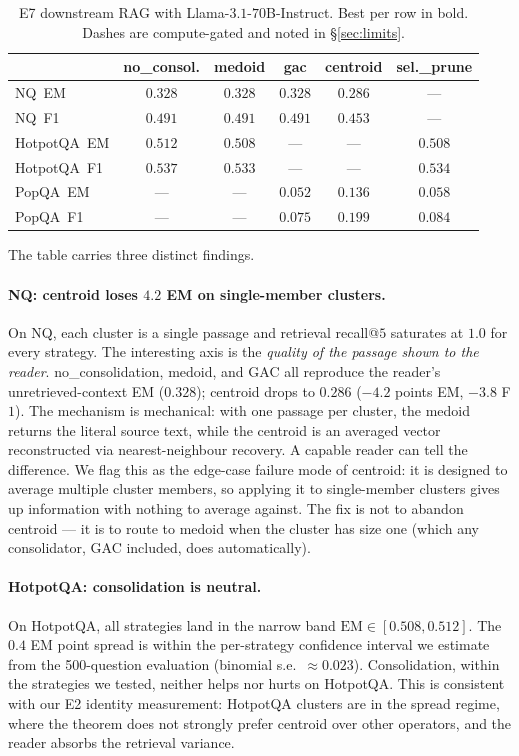 \begin{table}[h]
\centering
\small
\begin{tabular}{lccccc}
\toprule
 & \textbf{no\_consol.} & \textbf{medoid} & \textbf{gac} & \textbf{centroid} & \textbf{sel.\_prune} \\
\midrule
NQ~EM       & $\mathbf{0.328}$ & $0.328$ & $0.328$ & $0.286$ & --- \\
NQ~F1       & $\mathbf{0.491}$ & $0.491$ & $0.491$ & $0.453$ & --- \\
HotpotQA~EM & $\mathbf{0.512}$ & $0.508$ & --- & --- & $0.508$ \\
HotpotQA~F1 & $\mathbf{0.537}$ & $0.533$ & --- & --- & $0.534$ \\
PopQA~EM    & --- & --- & $0.052$ & $\mathbf{0.136}$ & $0.058$ \\
PopQA~F1    & --- & --- & $0.075$ & $\mathbf{0.199}$ & $0.084$ \\
\bottomrule
\end{tabular}
\caption{E7 downstream RAG with Llama-$3.1$-$70$B-Instruct. Best per
row in bold. Dashes are compute-gated and noted in \S\ref{sec:limits}.}
\label{tab:e7-70b}
\end{table}

The table carries three distinct findings.

\paragraph{NQ: centroid loses $4.2$ EM on single-member clusters.}
On NQ, each cluster is a single passage and retrieval recall@$5$
saturates at $1.0$ for every strategy. The interesting axis is the
\emph{quality of the passage shown to the reader}. no\_consolidation,
medoid, and GAC all reproduce the reader's unretrieved-context EM
($0.328$); centroid drops to $0.286$ ($-4.2$ points EM, $-3.8$ F$1$).
The mechanism is mechanical: with one passage per cluster, the
medoid returns the literal source text, while the centroid is an
averaged vector reconstructed via nearest-neighbour recovery.
A capable reader can tell the difference. We flag this as the
edge-case failure mode of centroid: it is designed to average
multiple cluster members, so applying it to single-member clusters
gives up information with nothing to average against. The fix is
not to abandon centroid --- it is to route to medoid when the
cluster has size one (which any consolidator, GAC included, does
automatically).

\paragraph{HotpotQA: consolidation is neutral.} On HotpotQA, all
strategies land in the narrow band $\mathrm{EM} \in [0.508, 0.512]$.
The $0.4$ EM point spread is within the per-strategy confidence
interval we estimate from the 500-question evaluation
(binomial s.e.\ $\approx 0.023$). Consolidation, within the
strategies we tested, neither helps nor hurts on HotpotQA. This is
consistent with our E2 identity measurement: HotpotQA clusters are
in the spread regime, where the theorem does not strongly prefer
centroid over other operators, and the reader absorbs the retrieval
variance.

